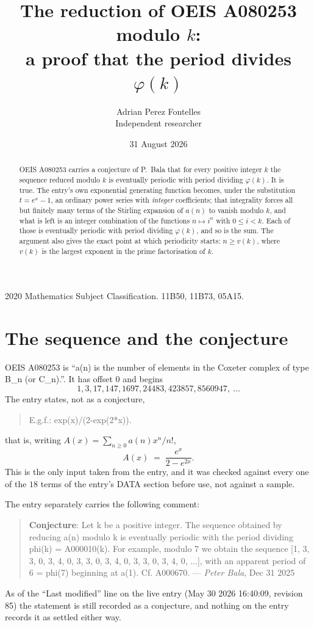 \documentclass[11pt,a4paper]{article}
\title{The reduction of OEIS A080253 modulo $k$:\\ a proof that the period divides
$\varphi(k)$}
\author{Adrian Perez Fontelles\\ \small Independent researcher}
\date{31 August 2026}
\theoremstyle{plain}
\theoremstyle{definition}
\begin{document}
\maketitle

\begin{abstract}
OEIS A080253 carries a conjecture of P.~Bala that for every positive integer $k$ the
sequence reduced modulo $k$ is eventually periodic with period dividing $\varphi(k)$.
It is true. The entry's own exponential generating function becomes, under the
substitution $t=e^{x}-1$, an ordinary power series with \emph{integer} coefficients;
that integrality forces all but finitely many terms of the Stirling expansion of $a(n)$
to vanish modulo $k$, and what is left is an integer combination of the functions
$n\mapsto i^{n}$ with $0\le i<k$. Each of those is eventually periodic with period
dividing $\varphi(k)$, and so is the sum. The argument also gives the exact point at
which periodicity starts: $n\ge v(k)$, where $v(k)$ is the largest exponent in the
prime factorisation of $k$.
\end{abstract}

\noindent\small 2020 Mathematics Subject Classification. 11B50, 11B73, 05A15.\normalsize

\section{The sequence and the conjecture}

OEIS A080253 is ``a(n) is the number of elements in the Coxeter complex of type B\_n (or C\_n).''. It has offset $0$ and begins
\[
1, 3, 17, 147, 1697, 24483, 423857, 8560947,\ \dots
\]
The entry states, not as a conjecture,
\begin{quote}\small
E.g.f.: exp(x)/(2-exp(2*x)).
\end{quote}
that is, writing $A(x)=\sum_{n\ge 0}a(n)x^{n}/n!$,
\begin{equation}\label{eq:egf}
A(x)\;=\;\frac{e^{x}}{2-e^{2x}}.
\end{equation}
This is the only input taken from the entry, and it was checked against every one of the
$18$ terms of the entry's DATA section before use, not against a sample.

The entry separately carries the following comment:
\begin{quote}\small
\textbf{Conjecture}: Let k be a positive integer. The sequence obtained by reducing a(n) modulo k is eventually periodic with the period dividing phi(k) = A000010(k). For example, modulo 7 we obtain the sequence [1, 3, 3, 0, 3, 4, 0, 3, 3, 0, 3, 4, 0, 3, 3, 0, 3, 4, 0, ...], with an apparent period of 6 = phi(7) beginning at a(1). Cf. A000670. --- \emph{Peter Bala}, Dec 31 2025
\end{quote}
As of the ``Last modified'' line on the live entry (May 30 2026 16:40:09, revision
85) the statement is still recorded as a conjecture, and nothing on the entry
records it as settled either way.
\end{document}
